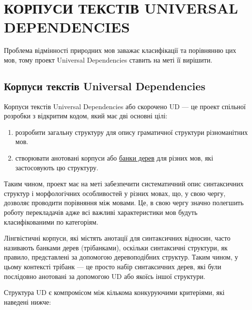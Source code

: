 \section{КОРПУСИ ТЕКСТІВ UNIVERSAL DEPENDENCIES}

Проблема відмінності природних мов заважає класифікації та порівнянню цих мов,
тому проект Universal Dependencies ставить на меті її вирішити.



\subsection{Корпуси текстів Universal Dependencies}
Корпуси текстів Universal Dependencies або скорочено UD — це проект спільної розробки
з відкритим кодом, який має дві основні цілі:

\begin{enumerate}
    \item розробити загальну структуру для опису граматичної структури різноманітних мов.
    \cite{bib1}
    \item створювати анотовані корпуси або \hyperlink{term0}{банки дерев} для різних мов,
    які застосовують цю структуру. \cite{bib2}
\end{enumerate}

Таким чином, проект має на меті забезпечити систематичний опис синтаксичних структур і
морфологічних особливостей у різних мовах, що, у свою чергу, дозволяє проводити порівняння
між мовами. Це, в свою чергу значно полегшить роботу перекладачів
адже всі важливі характеристики мов будуть класифікованими по категоріям.

Лінгвістичні корпуси, які містять анотації для синтаксичних відносин,
часто називають банками дерев (трібанками), оскільки синтаксичні структури, як правило,
представлені за допомогою деревоподібних структур. Таким чином, у цьому контексті трібанк —
це просто набір синтаксичних дерев, які були послідовно анотовані за допомогою UD
або якоїсь іншої структури.

Структура UD є компромісом між кількома конкуруючими критеріями, які наведені нижче:

